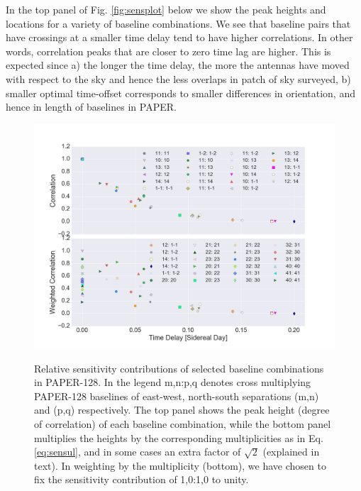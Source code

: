 \documentclass[preprint2,numberedappendix,tighten,twocolappendix]{aastex6}  %
\renewcommand\[{\begin{equation}}
\renewcommand\]{\end{equation}}
\begin{document}
In the top panel of Fig. \eqref{fig:sensplot} below
we show the peak heights and locations for a variety of baseline combinations.
We see that baseline pairs that have crossings at a smaller time delay
tend to have higher correlations. In other words, correlation peaks
that are closer to zero time lag are higher. This is expected since
a) the longer the time delay, the more the antennas have moved with respect
to the sky and hence the less overlaps in patch of sky surveyed, b) smaller optimal
time-offset corresponds to smaller differences in orientation, and hence in length of
baselines in PAPER. 

\begin{widetext}
\begin{figure}[H]
\includegraphics[scale=0.5]{sensitivity}
\label{fig:sensplot}
\caption{Relative sensitivity contributions of selected baseline combinations in PAPER-128. In the legend m,n:p,q denotes cross
multiplying PAPER-128 baselines of east-west, north-south separations (m,n) and (p,q) respectively. The top
panel shows the peak height (degree of correlation) of each baseline
combination, while the bottom panel multiplies the heights by the
corresponding multiplicities as in Eq. \eqref{eq:sensul}, and in some cases an extra factor of $\sqrt{2}$ (explained in text). 
In weighting by the multiplicity (bottom), we have chosen to fix the sensitivity 
contribution of 1,0:1,0 to unity. }
\end{figure}
\end{widetext}
\end{document}
